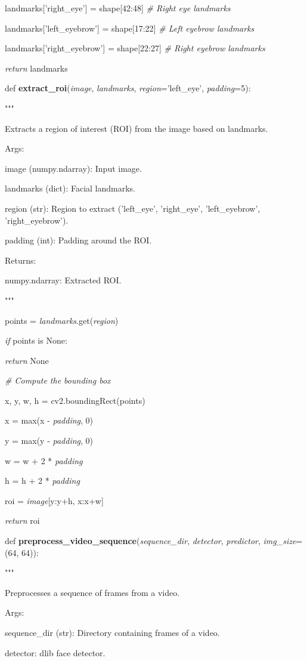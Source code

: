 \documentclass[
]{article}
\begin{document}
landmarks{[}'right\_eye'{]} = shape{[}42:48{]} \emph{\# Right eye landmarks}

landmarks{[}'left\_eyebrow'{]} = shape{[}17:22{]} \emph{\# Left eyebrow landmarks}

landmarks{[}'right\_eyebrow'{]} = shape{[}22:27{]} \emph{\# Right eyebrow landmarks}

\emph{return} landmarks

def \textbf{extract\_roi}(\emph{image}, \emph{landmarks}, \emph{region}='left\_eye', \emph{padding}=5):

"""

Extracts a region of interest (ROI) from the image based on landmarks.

Args:

image (numpy.ndarray): Input image.

landmarks (dict): Facial landmarks.

region (str): Region to extract ('left\_eye', 'right\_eye', 'left\_eyebrow', 'right\_eyebrow').

padding (int): Padding around the ROI.

Returns:

numpy.ndarray: Extracted ROI.

"""

points = \emph{landmarks}.get(\emph{region})

\emph{if} points is None:

\emph{return} None

\emph{\# Compute the bounding box}

x, y, w, h = cv2.boundingRect(points)

x = max(x - \emph{padding}, 0)

y = max(y - \emph{padding}, 0)

w = w + 2 * \emph{padding}

h = h + 2 * \emph{padding}

roi = \emph{image}{[}y:y+h, x:x+w{]}

\emph{return} roi

def \textbf{preprocess\_video\_sequence}(\emph{sequence\_dir}, \emph{detector}, \emph{predictor}, \emph{img\_size}=(64, 64)):

"""

Preprocesses a sequence of frames from a video.

Args:

sequence\_dir (str): Directory containing frames of a video.

detector: dlib face detector.
\end{document}
